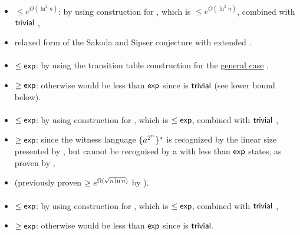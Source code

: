 \paragraph{\TNFA{}\tto\ODLA}
\begin{itemize}
	\item $\le e^{O(\ln^2n)}$: by using construction for \hyperref[cost:2NFAto2DFAu]{\TNFA{}\tto\TDFA}, which is $\le e^{O(\ln^2n)}$, combined with $\mathsf{trivial}$ \TDFA{}\tto\ODLA,
	\item relaxed form of the Sakoda and Sipser conjecture with extended \TDFA.
\end{itemize}
\paragraph{\ODLA{}\tto\ODFA}\label{cost:1DLAto1DFAu}
\begin{itemize}
	\item $\le\mathsf{exp}$: by using the transition table construction for the \hyperref[cost:1DLAto1DFA]{general case} \cite{PigPis14},
	\item $\ge\mathsf{exp}$: otherwise \hyperref[cost:1DLAto2NFAu]{\ODLA{}\tto\TNFA} would be less than $\mathsf{exp}$ since \ODFA{}\tto\TNFA is $\mathsf{trivial}$ (see lower bound below).
\end{itemize}
\paragraph{\ODLA{}\tto\TNFA}\label{cost:1DLAto2NFAu}
\begin{itemize}
	\item $\le\mathsf{exp}$: by using construction for \hyperref[cost:1DLAto1DFAu]{\ODLA{}\tto\ODFA}, which is $\le\mathsf{exp}$, combined with $\mathsf{trivial}$ \ODFA{}\tto\TNFA,
	\item $\ge\mathsf{exp}$: since the witness language $\{a^{2^n}\}^*$ is recognized by the linear size \ODLA presented by , but cannot be recognised by a \TNFA with less than $\mathsf{exp}$ states, as proven by ,
	\item (previously proven $\ge e^{\Omega(\sqrt{n\ln n})}$ by ).
\end{itemize}
\paragraph{\ODLA{}\tto\ONFA}\label{cost:1LAto1NFAu}
\begin{itemize}
	\item $\le\mathsf{exp}$: by using construction for \hyperref[cost:1DLAto1DFAu]{\ODLA{}\tto\ODFA}, which is $\le\mathsf{exp}$, combined with $\mathsf{trivial}$ \ODFA{}\tto\ONFA,
	\item $\ge\mathsf{exp}$: otherwise \hyperref[cost:1DLAto2NFAu]{\ODLA{}\tto\TNFA} would be less than $\mathsf{exp}$ since \ONFA{}\tto\TNFA is $\mathsf{trivial}$.
\end{itemize}
